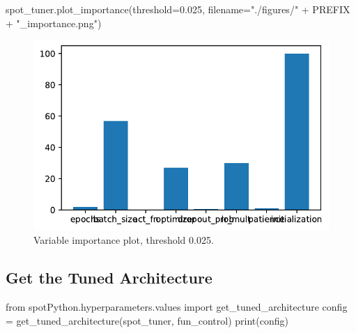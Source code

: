 \documentclass[
  letterpaper,
  DIV=11,
  numbers=noendperiod]{scrreprt}
\newenvironment{Shaded}{\begin{snugshade}}{\end{snugshade}}
\newcommand{\BuiltInTok}[1]{\textcolor[rgb]{0.00,0.23,0.31}{#1}}
\newcommand{\FloatTok}[1]{\textcolor[rgb]{0.68,0.00,0.00}{#1}}
\newcommand{\ImportTok}[1]{\textcolor[rgb]{0.00,0.46,0.62}{#1}}
\newcommand{\NormalTok}[1]{\textcolor[rgb]{0.00,0.23,0.31}{#1}}
\newcommand{\OperatorTok}[1]{\textcolor[rgb]{0.37,0.37,0.37}{#1}}
\newcommand{\StringTok}[1]{\textcolor[rgb]{0.13,0.47,0.30}{#1}}
\begin{document}
\begin{Shaded}
\begin{Highlighting}[]
\NormalTok{spot\_tuner.plot\_importance(threshold}\OperatorTok{=}\FloatTok{0.025}\NormalTok{,}
\NormalTok{    filename}\OperatorTok{=}\StringTok{"./figures/"} \OperatorTok{+}\NormalTok{ PREFIX }\OperatorTok{+} \StringTok{"\_importance.png"}\NormalTok{)}
\end{Highlighting}
\end{Shaded}

\begin{figure}[H]

{\centering \includegraphics{031_spot_lightning_linear_diabetes_files/figure-pdf/cell-15-output-1.pdf}

}

\caption{Variable importance plot, threshold 0.025.}

\end{figure}%

\subsection{Get the Tuned Architecture}\label{sec-get-spot-results-31}

\begin{Shaded}
\begin{Highlighting}[]
\ImportTok{from}\NormalTok{ spotPython.hyperparameters.values }\ImportTok{import}\NormalTok{ get\_tuned\_architecture}
\NormalTok{config }\OperatorTok{=}\NormalTok{ get\_tuned\_architecture(spot\_tuner, fun\_control)}
\BuiltInTok{print}\NormalTok{(config)}
\end{Highlighting}
\end{Shaded}
\end{document}
